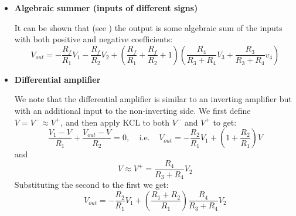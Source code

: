 \documentclass{article}
\begin{document}
\begin{itemize}
\item {\bf Algebraic summer (inputs of different signs)}

  
  \begin{comment}
  Define $V\stackrel{\triangle}{=}V^+ \approx V^- $. Apply KCL to $V^-$ and
  $V^+$ we get:
  \begin{equation}
    \frac{V_1-V}{R_1}+\frac{V_2-V}{R_2}+\frac{V_{out}-V}{R_f}=0,\;\;\;\;\;\;
    \mbox{and}\;\;\;\;\;\;\;\;
    \frac{V_3-V}{R_3}+\frac{V_4-V}{R_4}=0 
  \end{equation}
  Solving the 2nd equation for $V$ we get:
  \begin{equation}
    V=\frac{R_4}{R_3+R_4} V_3 + \frac{R_3}{R_3+R_4} V_4	
  \end{equation}
  and substitute it into the first equation to get
  \begin{equation}
    V_{out}=-\frac{R_f}{R_1}V_1-\frac{R_f}{R_2}V_2
    +\left(\frac{R_f}{R_1}+\frac{R_f}{R_2}+1\right)
    \left(\frac{R_4}{R_3+R_4} V_3+\frac{R_3}{R_3+R_4} v_4\right) 
  \end{equation}
  \end{comment}

  It can be shown that (see )
  the output is some algebraic sum of the inputs with both positive and
  negative coefficients:
  \begin{equation}
    V_{out}=-\frac{R_f}{R_1}V_1-\frac{R_f}{R_2}V_2
    +\left(\frac{R_f}{R_1}+\frac{R_f}{R_2}+1\right)
    \left(\frac{R_4}{R_3+R_4} V_3+\frac{R_3}{R_3+R_4} v_4\right) 
  \end{equation}

\item {\bf Differential amplifier}


  We note that the differential amplifier is similar to an inverting
  amplifier but with an additional input to the non-inverting side.
  We first define $V=V^-\approx V^+$, and then apply KCL to both $V^-$ 
  and $V^+$ to get:
  \begin{equation} 
    \frac{V_1-V}{R_1}+\frac{V_{out}-V}{R_2}=0,\;\;\;\;\mbox{i.e.}\;\;\;\;
    V_{out}=-\frac{R_2}{R_1}V_1+\left(1+\frac{R_2}{R_1}\right) V 
  \end{equation}
  and
  \begin{equation} 
    V\approx V^+=\frac{R_4}{R_3+R_4}V_2 
  \end{equation}
  Substituting the second to the first we get:
  \begin{equation}
    V_{out}=-\frac{R_2}{R_1}V_1+\left(\frac{R_1+R_2}{R_1}\right)\frac{R_4}{R_3+R_4}V_2 
  \end{equation}


\end{itemize}
\end{document}
